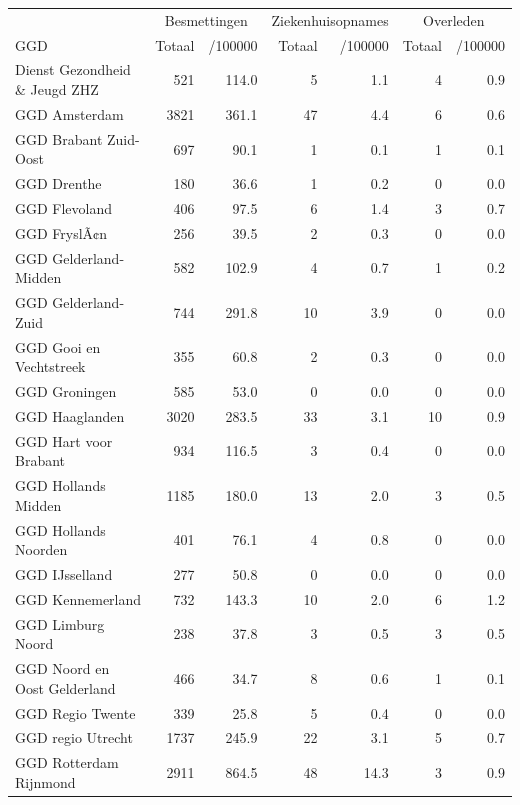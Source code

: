 \documentclass[
  english,
  man,floatsintext]{apa6}
\begin{document}
\begin{table}[H]
\centering\begingroup\fontsize{10}{12}\selectfont

\begin{threeparttable}
\begin{tabular}{lrrrrrr}
\toprule
\multicolumn{1}{c}{ } & \multicolumn{2}{c}{Besmettingen} & \multicolumn{2}{c}{Ziekenhuisopnames} & \multicolumn{2}{c}{Overleden} \\
\cmidrule(l{3pt}r{3pt}){2-3} \cmidrule(l{3pt}r{3pt}){4-5} \cmidrule(l{3pt}r{3pt}){6-7}
GGD & Totaal & /100000 & Totaal & /100000 & Totaal & /100000\\
\midrule
Dienst Gezondheid \& Jeugd ZHZ & 521 & 114.0 & 5 & 1.1 & 4 & 0.9\\
GGD Amsterdam & 3821 & 361.1 & 47 & 4.4 & 6 & 0.6\\
GGD Brabant Zuid-Oost & 697 & 90.1 & 1 & 0.1 & 1 & 0.1\\
GGD Drenthe & 180 & 36.6 & 1 & 0.2 & 0 & 0.0\\
GGD Flevoland & 406 & 97.5 & 6 & 1.4 & 3 & 0.7\\
GGD FryslÃ¢n & 256 & 39.5 & 2 & 0.3 & 0 & 0.0\\
GGD Gelderland-Midden & 582 & 102.9 & 4 & 0.7 & 1 & 0.2\\
GGD Gelderland-Zuid & 744 & 291.8 & 10 & 3.9 & 0 & 0.0\\
GGD Gooi en Vechtstreek & 355 & 60.8 & 2 & 0.3 & 0 & 0.0\\
GGD Groningen & 585 & 53.0 & 0 & 0.0 & 0 & 0.0\\
GGD Haaglanden & 3020 & 283.5 & 33 & 3.1 & 10 & 0.9\\
GGD Hart voor Brabant & 934 & 116.5 & 3 & 0.4 & 0 & 0.0\\
GGD Hollands Midden & 1185 & 180.0 & 13 & 2.0 & 3 & 0.5\\
GGD Hollands Noorden & 401 & 76.1 & 4 & 0.8 & 0 & 0.0\\
GGD IJsselland & 277 & 50.8 & 0 & 0.0 & 0 & 0.0\\
GGD Kennemerland & 732 & 143.3 & 10 & 2.0 & 6 & 1.2\\
GGD Limburg Noord & 238 & 37.8 & 3 & 0.5 & 3 & 0.5\\
GGD Noord en Oost Gelderland & 466 & 34.7 & 8 & 0.6 & 1 & 0.1\\
GGD Regio Twente & 339 & 25.8 & 5 & 0.4 & 0 & 0.0\\
GGD regio Utrecht & 1737 & 245.9 & 22 & 3.1 & 5 & 0.7\\
GGD Rotterdam Rijnmond & 2911 & 864.5 & 48 & 14.3 & 3 & 0.9\\

\end{tabular}
\end{threeparttable}
\end{table}
\end{document}
